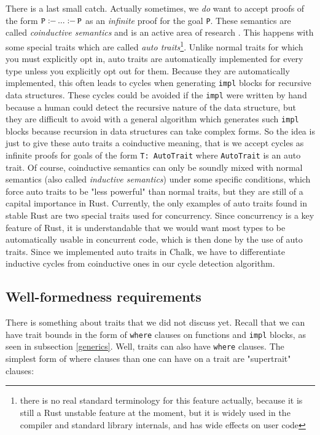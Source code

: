 \documentclass[twocolumn]{article}
\newcommand{\rust}[1]{\texttt{#1}}
\newcommand{\mrust}[1]{\text{\rust{#1}}}
\newcommand{\pif}[0]{:\!\!-\,}
\begin{document}
There is a last small catch. Actually sometimes, we \textit{do} want to accept proofs of the form $\mrust{P} \pif ... \pif \mrust{P}$ as an \textit{infinite} proof for the goal \rust{P}. These semantics are called \textit{coinductive semantics} and is an active area of research \cite{coind}. This happens with some special traits which are called \textit{auto traits}\footnote{there is no real standard terminology for this feature actually, because it is still a Rust unstable feature at the moment, but it is widely used in the compiler and standard library internals, and has wide effects on user code}. Unlike normal traits for which you must explicitly opt in, auto traits are automatically implemented for every type unless you explicitly opt out for them. Because they are automatically implemented, this often leads to cycles when generating \rust{impl} blocks for recursive data structures. These cycles could be avoided if the \rust{impl} were written by hand because a human could detect the recursive nature of the data structure, but they are difficult to avoid with a general algorithm which generates such \rust{impl} blocks because recursion in data structures can take complex forms. So the idea is just to give these auto traits a coinductive meaning, that is we accept cycles as infinite proofs for goals of the form \rust{T: AutoTrait} where \rust{AutoTrait} is an auto trait. Of course, coinductive semantics can only be soundly mixed with normal semantics (also called \textit{inductive semantics}) under some specific conditions, which force auto traits to be "less powerful" than normal traits, but they are still of a capital importance in Rust. Currently, the only examples of auto traits found in stable Rust are two special traits used for concurrency. Since concurrency is a key feature of Rust, it is understandable that we would want most types to be automatically usable in concurrent code, which is then done by the use of auto traits. Since we implemented auto traits in Chalk, we have to differentiate inductive cycles from coinductive ones in our cycle detection algorithm.

\subsection{Well-formedness requirements}
There is something about traits that we did not discuss yet. Recall that we can have trait bounds in the form of \rust{where} clauses on functions and \rust{impl} blocks, as seen in subsection \ref{generics}. Well, traits can also have \rust{where} clauses. The simplest form of where clauses than one can have on a trait are "supertrait" clauses:
\end{document}
